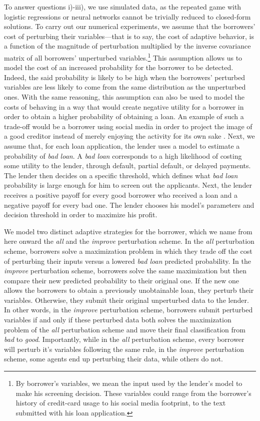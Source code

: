 \documentclass[12pt]{article} %
\begin{document}
To answer questions i)-iii), we use simulated data, as the repeated game with logistic regressions or neural networks cannot be trivially reduced to closed-form solutions. To carry out our numerical experiments, we assume that the borrowers' cost of perturbing their variables---that is to say, the cost of adaptive behavior, is a function of the magnitude of perturbation multiplied by the inverse covariance matrix of all borrowers' unperturbed variables.\footnote{By borrower's variables, we mean the input used by the lender's model to make his screening decision. These variables could range from the borrower's history of credit-card usage to his social media footprint, to the text submitted with his loan application.}
This assumption allows us to model the cost of an increased probability for the borrower to be detected. Indeed, the said probability is likely to be high when the borrowers' perturbed variables are less likely to come from the same distribution as the unperturbed ones. With the same reasoning, this assumption can also be used to model the costs of behaving in a way that would create negative utility for a borrower in order to obtain a higher probability of obtaining a loan. An example of such a trade-off would be a borrower using social media in order to project the image of a good creditor instead of merely enjoying the activity for its own sake \citep{wei2016credit}. 
Next, we assume that, for each loan application, the lender uses a model to estimate a probability of \textit{bad loan}. A \textit{bad loan} corresponds to a high likelihood of costing some utility to the lender, through default, partial default, or delayed payments. The lender then decides on a specific threshold, which defines what \textit{bad loan} probability is large enough for him to screen out the applicants. Next, the lender receives a positive payoff for every good borrower who received a loan and a negative payoff for every bad one. The lender chooses his model's parameters and decision threshold in order to maximize his profit.


We model two distinct adaptive strategies for the borrower, which we name from here onward the \textit{all} and the \textit{improve} perturbation scheme. In the \textit{all} perturbation scheme, borrowers solve a maximization problem in which they trade off the cost of perturbing their inputs versus a lowered \textit{bad loan} predicted probability. In the \textit{improve} perturbation scheme, borrowers solve the same maximization but then compare their new predicted probability to their original one. If the new one allows the borrowers to obtain a previously unobtainable loan, they perturb their variables. Otherwise, they submit their original unperturbed data to the lender. In other words, in the \textit{improve} perturbation scheme, borrowers submit perturbed variables if and only if these perturbed data both solves the maximization problem of the \textit{all} perturbation scheme and move their final classification from \textit{bad} to \textit{good}. Importantly, while in the \textit{all} perturbation scheme, every borrower will perturb it's variables following the same rule, in the \textit{improve} perturbation scheme, some agents end up perturbing their data, while others do not. 
\end{document}
